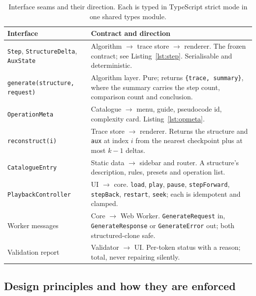 \documentclass[11pt,a4paper]{article}
\newcommand{\ct}[1]{\texttt{#1}}
\begin{document}
\begin{table}[H]
\centering
\small
\setlength{\tabcolsep}{4pt}
\begin{tabular}{@{}L{3.6cm}L{11.6cm}@{}}
\toprule
\textbf{Interface} & \textbf{Contract and direction} \\
\midrule
\ct{Step}, \ct{StructureDelta}, \ct{AuxState} & Algorithm $\to$ trace store $\to$ renderer. The
frozen contract; see Listing~\ref{lst:step}. Serialisable and deterministic. \\
\ct{generate(structure, request)} & Algorithm layer. Pure; returns \ct{\{trace, summary\}}, where
the summary carries the step count, comparison count and conclusion. \\
\ct{OperationMeta} & Catalogue $\to$ menu, guide, pseudocode id, complexity card. Listing~\ref{lst:opmeta}. \\
\ct{reconstruct(i)} & Trace store $\to$ renderer. Returns the structure and \ct{aux} at index $i$
from the nearest checkpoint plus at most $k-1$ deltas. \\
\ct{CatalogueEntry} & Static data $\to$ sidebar and router. A structure's description, rules,
presets and operation list. \\
\ct{PlaybackController} & UI $\to$ core. \ct{load}, \ct{play}, \ct{pause}, \ct{stepForward},
\ct{stepBack}, \ct{restart}, \ct{seek}; each is idempotent and clamped. \\
Worker messages & Core $\to$ Web Worker. \ct{GenerateRequest} in, \ct{GenerateResponse} or
\ct{GenerateError} out; both structured-clone safe. \\
Validation report & Validator $\to$ UI. Per-token status with a reason; total, never repairing
silently. \\
\bottomrule
\end{tabular}
\caption{Interface seams and their direction. Each is typed in TypeScript strict mode in one shared
types module.}
\end{table}

\subsection{Design principles and how they are enforced}
\end{document}

